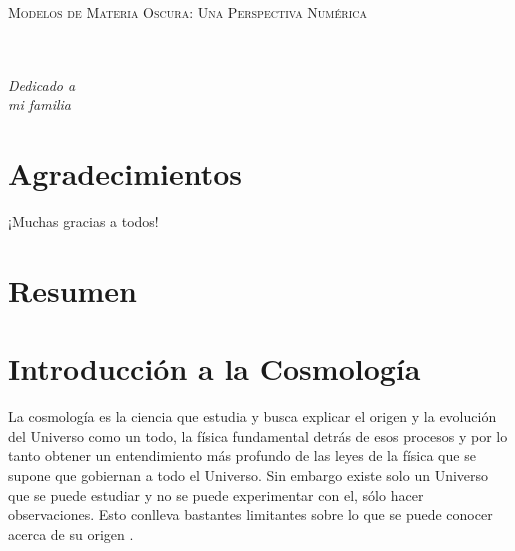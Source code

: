 \documentclass[a4paper,openright,12pt]{book}
\begin{document}
\begin{titlepage}
\begin{center}
\begin{Huge}
\textsc{Modelos de Materia Oscura: Una Perspectiva Numérica}
\end{Huge}
\end{center}
\end{titlepage}

\newpage
$\ $
\thispagestyle{empty} %

\chapter*{}
\begin{flushright}
\textit{Dedicado a \\
mi familia}
\end{flushright}

\chapter*{Agradecimientos} %

¡Muchas gracias a todos!

\chapter*{Resumen} %

\tableofcontents %

\cleardoublepage
{} %
\listoffigures %

\cleardoublepage
{} %
\listoftables %




\chapter{Introducción a la Cosmología}
La cosmología es la ciencia que estudia y busca explicar el origen y la evolución del Universo como un todo, la física fundamental detrás de esos procesos y por lo tanto obtener un entendimiento más profundo de las leyes de la física que se supone que gobiernan a todo el Universo. Sin embargo existe solo un Universo que se puede estudiar y no se puede  experimentar con el, sólo hacer observaciones. Esto conlleva bastantes limitantes sobre lo que se puede conocer acerca de su origen \cite{1.01}. 
\end{document}
